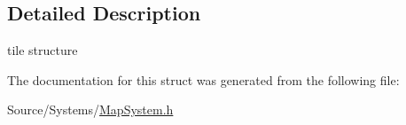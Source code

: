 \subsection{Detailed Description}
tile structure 

The documentation for this struct was generated from the following file\+:\begin{DoxyCompactItemize}
\item 
Source/\+Systems/\mbox{\hyperlink{_map_system_8h}{Map\+System.\+h}}\end{DoxyCompactItemize}
